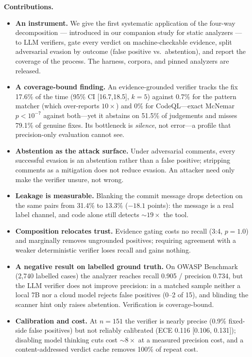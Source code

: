 \documentclass[conference]{IEEEtran}
\begin{document}
\noindent\textbf{Contributions.}
\begin{itemize}
\item \textbf{An instrument.} We give the first systematic application of the
four-way decomposition --- introduced in our companion study for static
analyzers \cite{sastaudit} --- to LLM verifiers, gate every verdict on
machine-checkable evidence, split adversarial evasion by outcome
(false positive vs.\ abstention), and report the coverage of the process.
The harness, corpora, and pinned analyzers are released.
\item \textbf{A coverage-bound finding.} An evidence-grounded verifier tracks the
fix 17.6\% of the time (95\% CI [16.7,18.5], $k{=}5$) against 0.7\% for the pattern
matcher (which over-reports $10\times$) and 0\% for CodeQL---exact McNemar
$p{<}10^{-7}$ against both---yet it abstains on 51.5\% of judgements and misses
79.1\% of genuine fixes. Its bottleneck is \emph{silence}, not error---a profile
that precision-only evaluation cannot see.
\item \textbf{Abstention as the attack surface.} Under adversarial comments, every
successful evasion is an abstention rather than a false positive; stripping
comments as a mitigation does not reduce evasion. An attacker need only make the
verifier unsure, not wrong.
\item \textbf{Leakage is measurable.} Blanking the commit message drops detection
on the same pairs from 31.4\% to 13.3\% ($-18.1$ points): the message is a real
label channel, and code alone still detects ${\sim}19\times$ the tool.
\item \textbf{Composition relocates trust.} Evidence gating costs no recall
(3:4, $p{=}1.0$) and marginally removes ungrounded positives; requiring agreement
with a weaker deterministic verifier loses recall and gains nothing.
\item \textbf{A negative result on labelled ground truth.} On OWASP Benchmark
(2{,}740 labelled cases) the analyzer reaches recall 0.905 / precision 0.734, but
the LLM verifier does not improve precision: in a matched sample neither a local
7B nor a cloud model rejects false positives (0--2 of 15), and blinding the
scanner hint only raises abstention. Verification is coverage-bound.
\item \textbf{Calibration and cost.} At $n{=}151$ the verifier is nearly precise
(0.9\% fixed-side false positives) but not reliably calibrated (ECE 0.116
[0.106, 0.131]); disabling model thinking cuts cost ${\sim}8\times$ at a measured
precision cost, and a content-addressed verdict cache removes 100\% of repeat
cost.
\end{itemize}
\end{document}
